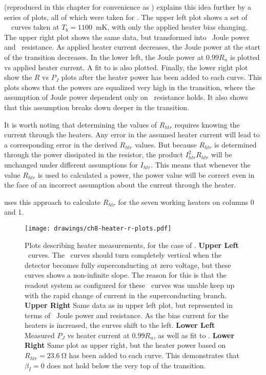  (reproduced in this chapter for convenience as ) explains this idea further by a series of plots, all of which were taken for .
The upper left plot shows a set of \TES\ \IV\ curves taken at $T_b = 1100$~mK, with only the applied heater bias changing.
The upper right plot shows the same data, but transformed into \TES\ Joule power and \TES\ resistance.
As applied heater current decreases, the Joule power at the start of the transition decreases.
In the lower left, the Joule power at $0.99R_{n}$ is plotted vs applied heater current.
A fit to  is also plotted.
Finally, the lower right plot show the $R$ vs $P_J$ plots after the heater power has been added to each curve.
This plots shows that the powers are equalized very high in the transition, where the assumption of Joule power dependent only on \TES\ resistance holds.
It also shows that this assumption breaks down deeper in the transition.

It is worth noting that determining the values of $R_{htr}$ requires knowing the current through the heaters.
Any error in the assumed heater current will lead to a corresponding error in the derived $R_{htr}$ values.
But because $R_{htr}$ is determined through the power dissipated in the resistor, the product $I_{htr}^2 R_{htr}$ will be unchanged under different assumptions for $I_{htr}$.
This means that whenever the value $R_{htr}$ is used to calculated a power, the power value will be correct even in the face of an incorrect assumption about the current through the heater.

 uses this approach to calculate $R_{htr}$ for the seven working heaters on columns 0 and 1.

\begin{figure*}
\texttt{[image: drawings/ch8-heater-r-plots.pdf]}
\caption{Plots describing heater measurements, for the case of .
\textbf{Upper Left} \IV\ curves. The \IV\ curves should turn completely vertical when the detector becomes fully superconducting at zero voltage, but these curves shows a non-infinite slope. The reason for this is that the readout system as configured for these \IV\ curves was unable keep up with the rapid change of current in the superconducting branch.
\textbf{Upper Right} Same data as in upper left plot, but represented in terms of \TES\ Joule power and resistance. As the bias current for the heaters is increased, the curves shift to the left.
\textbf{Lower Left} Measured $P_{J}$ vs heater current at $0.99R_n$, as well as fit to .
\textbf{Lower Right} Same plot as upper right, but the heater power based on $R_{htr} = \SI{23.6}{\ohm}$ has been added to each curve.
This demonstrates that $\beta_I = 0$ does not hold below the very top of the transition.}
\label{fig:ch3-heater-r-plots}
\end{figure*}

